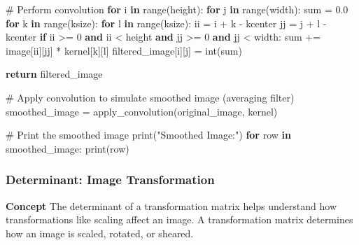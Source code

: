 \documentclass[
  letterpaper,
  DIV=11,
  numbers=noendperiod]{scrreprt}
\newenvironment{Shaded}{\begin{snugshade}}{\end{snugshade}}
\newcommand{\BuiltInTok}[1]{\textcolor[rgb]{0.00,0.23,0.31}{#1}}
\newcommand{\CommentTok}[1]{\textcolor[rgb]{0.37,0.37,0.37}{#1}}
\newcommand{\ControlFlowTok}[1]{\textcolor[rgb]{0.00,0.23,0.31}{\textbf{#1}}}
\newcommand{\DecValTok}[1]{\textcolor[rgb]{0.68,0.00,0.00}{#1}}
\newcommand{\FloatTok}[1]{\textcolor[rgb]{0.68,0.00,0.00}{#1}}
\newcommand{\KeywordTok}[1]{\textcolor[rgb]{0.00,0.23,0.31}{\textbf{#1}}}
\newcommand{\NormalTok}[1]{\textcolor[rgb]{0.00,0.23,0.31}{#1}}
\newcommand{\OperatorTok}[1]{\textcolor[rgb]{0.37,0.37,0.37}{#1}}
\newcommand{\StringTok}[1]{\textcolor[rgb]{0.13,0.47,0.30}{#1}}
\theoremstyle{plain}
\theoremstyle{definition}
\theoremstyle{remark}
\begin{document}
\begin{Shaded}
\begin{Highlighting}[]
    \CommentTok{\# Perform convolution}
    \ControlFlowTok{for}\NormalTok{ i }\KeywordTok{in} \BuiltInTok{range}\NormalTok{(height):}
        \ControlFlowTok{for}\NormalTok{ j }\KeywordTok{in} \BuiltInTok{range}\NormalTok{(width):}
            \BuiltInTok{sum} \OperatorTok{=} \FloatTok{0.0}
            \ControlFlowTok{for}\NormalTok{ k }\KeywordTok{in} \BuiltInTok{range}\NormalTok{(ksize):}
                \ControlFlowTok{for}\NormalTok{ l }\KeywordTok{in} \BuiltInTok{range}\NormalTok{(ksize):}
\NormalTok{                    ii }\OperatorTok{=}\NormalTok{ i }\OperatorTok{+}\NormalTok{ k }\OperatorTok{{-}}\NormalTok{ kcenter}
\NormalTok{                    jj }\OperatorTok{=}\NormalTok{ j }\OperatorTok{+}\NormalTok{ l }\OperatorTok{{-}}\NormalTok{ kcenter}
                    \ControlFlowTok{if}\NormalTok{ ii }\OperatorTok{\textgreater{}=} \DecValTok{0} \KeywordTok{and}\NormalTok{ ii }\OperatorTok{\textless{}}\NormalTok{ height }\KeywordTok{and}\NormalTok{ jj }\OperatorTok{\textgreater{}=} \DecValTok{0} \KeywordTok{and}\NormalTok{ jj }\OperatorTok{\textless{}}\NormalTok{ width:}
                        \BuiltInTok{sum} \OperatorTok{+=}\NormalTok{ image[ii][jj] }\OperatorTok{*}\NormalTok{ kernel[k][l]}
\NormalTok{            filtered\_image[i][j] }\OperatorTok{=} \BuiltInTok{int}\NormalTok{(}\BuiltInTok{sum}\NormalTok{)}
    
    \ControlFlowTok{return}\NormalTok{ filtered\_image}

\CommentTok{\# Apply convolution to simulate smoothed image (averaging filter)}
\NormalTok{smoothed\_image }\OperatorTok{=}\NormalTok{ apply\_convolution(original\_image, kernel)}

\CommentTok{\# Print the smoothed image}
\BuiltInTok{print}\NormalTok{(}\StringTok{"Smoothed Image:"}\NormalTok{)}
\ControlFlowTok{for}\NormalTok{ row }\KeywordTok{in}\NormalTok{ smoothed\_image:}
    \BuiltInTok{print}\NormalTok{(row)}
\end{Highlighting}
\end{Shaded}

\subsubsection{Determinant: Image
Transformation}\label{determinant-image-transformation}

\textbf{Concept} The determinant of a transformation matrix helps
understand how transformations like scaling affect an image. A
transformation matrix determines how an image is scaled, rotated, or
sheared.
\end{document}
